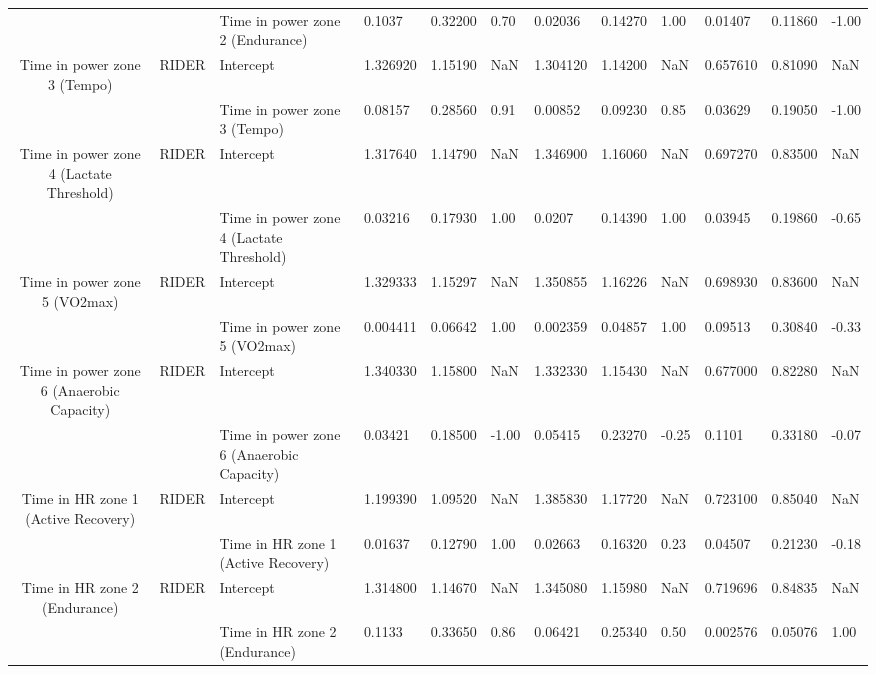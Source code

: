 \begin{tabular}{c}
                                      &       & Time in power zone 2 (Endurance) &    0.1037 &  0.32200 &  0.70 &   0.02036 &  0.14270 &  1.00 &   0.01407 &  0.11860 & -1.00 \\
Time in power zone 3 (Tempo) & RIDER & Intercept &  1.326920 &  1.15190 &   NaN &  1.304120 &  1.14200 &   NaN &  0.657610 &  0.81090 &   NaN \\
                                      &       & Time in power zone 3 (Tempo) &   0.08157 &  0.28560 &  0.91 &   0.00852 &  0.09230 &  0.85 &   0.03629 &  0.19050 & -1.00 \\
Time in power zone 4 (Lactate Threshold) & RIDER & Intercept &  1.317640 &  1.14790 &   NaN &  1.346900 &  1.16060 &   NaN &  0.697270 &  0.83500 &   NaN \\
                                      &       & Time in power zone 4 (Lactate Threshold) &   0.03216 &  0.17930 &  1.00 &    0.0207 &  0.14390 &  1.00 &   0.03945 &  0.19860 & -0.65 \\
Time in power zone 5 (VO2max) & RIDER & Intercept &  1.329333 &  1.15297 &   NaN &  1.350855 &  1.16226 &   NaN &  0.698930 &  0.83600 &   NaN \\
                                      &       & Time in power zone 5 (VO2max) &  0.004411 &  0.06642 &  1.00 &  0.002359 &  0.04857 &  1.00 &   0.09513 &  0.30840 & -0.33 \\
Time in power zone 6 (Anaerobic Capacity) & RIDER & Intercept &  1.340330 &  1.15800 &   NaN &  1.332330 &  1.15430 &   NaN &  0.677000 &  0.82280 &   NaN \\
                                      &       & Time in power zone 6 (Anaerobic Capacity) &   0.03421 &  0.18500 & -1.00 &   0.05415 &  0.23270 & -0.25 &    0.1101 &  0.33180 & -0.07 \\
Time in HR zone 1 (Active Recovery) & RIDER & Intercept &  1.199390 &  1.09520 &   NaN &  1.385830 &  1.17720 &   NaN &  0.723100 &  0.85040 &   NaN \\
                                      &       & Time in HR zone 1 (Active Recovery) &   0.01637 &  0.12790 &  1.00 &   0.02663 &  0.16320 &  0.23 &   0.04507 &  0.21230 & -0.18 \\
Time in HR zone 2 (Endurance) & RIDER & Intercept &  1.314800 &  1.14670 &   NaN &  1.345080 &  1.15980 &   NaN &  0.719696 &  0.84835 &   NaN \\
                                      &       & Time in HR zone 2 (Endurance) &    0.1133 &  0.33650 &  0.86 &   0.06421 &  0.25340 &  0.50 &  0.002576 &  0.05076 &  1.00 \\

\end{tabular}
